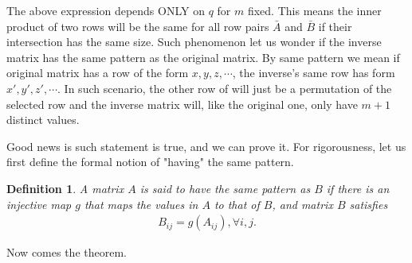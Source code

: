 \documentclass[10pt]{article}
\newtheorem{definition}{\bf Definition}
\newenvironment{Proof of lemma}{\noindent{\bf Proof of Lemma}}{\hfill$\Box$\newline}
\newenvironment{Proof of claim}{\noindent{\bf Proof of claim}}{\hfill$\Box$\newline}
\newenvironment{Proof of theorem}{\noindent{\bf Proof of Theorem}}{\hfill\scriptsize{$\Box$}\newline}
\newenvironment{Proof of theorems}{\noindent{\bf Proof of Theorems}}{\hfill$\Box$\newline}
\newenvironment{Proof of proposition}{\noindent{\bf Proof of Proposition}}{\hfill$\Box$\newline}
\newenvironment{Proof of propositions}{\noindent{\bf Proof of Propositions}}{\hfill$\Box$\newline}
\newenvironment{Proof of exercise}{\noindent{\it Proof of Exercise:}}{\hfill$\Box$}
\numberwithin{equation}{section}
\begin{document}
The above expression depends ONLY on $q$ for $m$ fixed. This means the inner product of two rows will be the same for all row pairs $\bar{A}$ and $\bar{B}$ if their intersection has the same size. Such phenomenon let us wonder if the inverse matrix has the same pattern as the original matrix. By same pattern we mean if original matrix has a row of the form $x,y,z,\cdots$, the inverse's same row has form $x',y',z', \cdots$. In such scenario, the other row of will just be a permutation of the selected row and the inverse matrix will, like the original one, only have $m+1$ distinct values.

Good news is such statement is true, and we can prove it. For rigorousness, let us first define the formal notion of "having" the same pattern.

\begin{definition}
    A matrix $A$ is said to have the same pattern as $B$ if there is an injective map $g$ that maps the values in $A$ to that of $B$, and matrix $B$ satisfies
    \begin{align}
        B_{ij} = g(A_{ij}), \forall i,j.
    \end{align}
\end{definition}

Now comes the theorem.
\end{document}
